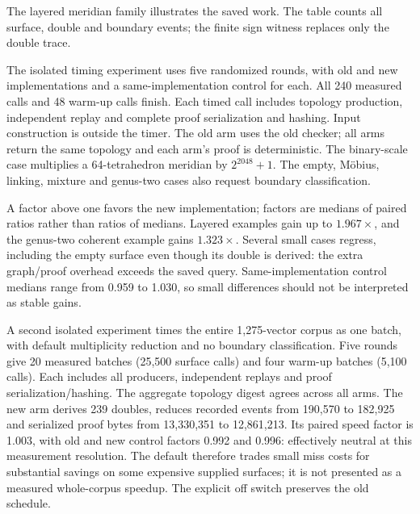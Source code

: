 The layered meridian family illustrates the saved work. The table counts
all surface, double and boundary events; the finite sign witness replaces
only the double trace.


The isolated timing experiment uses five randomized rounds, with old and
new implementations and a same-implementation control for each. All 240
measured calls and 48 warm-up calls finish. Each timed call includes topology
production, independent replay and complete proof serialization and hashing.
Input construction is outside the timer. The old arm uses the old checker;
all arms return the same topology and each arm's proof is deterministic.
The binary-scale case multiplies a 64-tetrahedron meridian by $2^{2048}+1$.
The empty, M\"obius, linking, mixture and genus-two cases also request
boundary classification.


A factor above one favors the new implementation; factors are medians of
paired ratios rather than ratios of medians. Layered examples gain up to
$1.967\times$, and the genus-two coherent example gains $1.323\times$.
Several small cases regress, including the empty surface even though its
double is derived: the extra graph/proof overhead exceeds the saved query.
Same-implementation control medians range from 0.959 to 1.030, so small
differences should not be interpreted as stable gains.

A second isolated experiment times the entire 1,275-vector corpus as one
batch, with default multiplicity reduction and no boundary classification.
Five rounds give 20 measured batches (25,500 surface calls) and four warm-up
batches (5,100 calls). Each includes all producers, independent replays
and proof serialization/hashing. The aggregate topology digest agrees
across all arms. The new arm derives 239 doubles, reduces recorded events
from 190,570 to 182,925 and serialized proof bytes from 13,330,351 to
12,861,213. Its paired speed factor is 1.003, with old and new control
factors 0.992 and 0.996: effectively neutral at this measurement resolution.
The default therefore trades small miss costs for substantial savings on
some expensive supplied surfaces; it is not presented as a measured
whole-corpus speedup. The explicit off switch preserves the old schedule.
